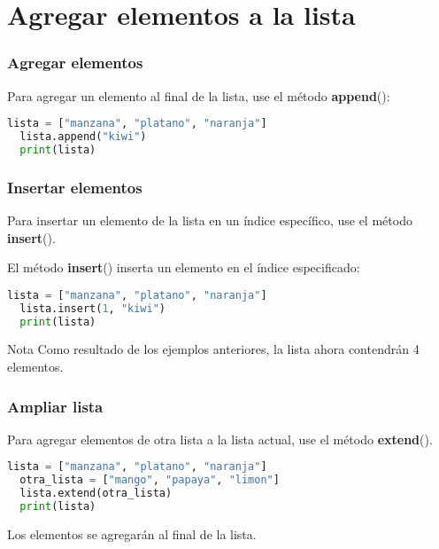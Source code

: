\section{Agregar elementos a la lista}

\begin{frame}[fragile]
  \frametitle{Agregar elementos}

  Para agregar un elemento al final de la lista, use el método
  \textbf{append}():

  \vspace{\baselineskip}
  \begin{lstlisting}[language=Python]
  lista = ["manzana", "platano", "naranja"]
  lista.append("kiwi")
  print(lista)
  \end{lstlisting}
\end{frame}

\begin{frame}[fragile]
  \frametitle{Insertar elementos}

  Para insertar un elemento de la lista en un índice específico,
  use el método \textbf{insert}().

  El método \textbf{insert}() inserta un elemento en el
  índice especificado: 

  \vspace{\baselineskip}
  \begin{lstlisting}[language=Python]
  lista = ["manzana", "platano", "naranja"]
  lista.insert(1, "kiwi")
  print(lista)
  \end{lstlisting}

  \begin{exampleblock}{Nota}
    Como resultado de los ejemplos anteriores,
    la lista ahora contendrán 4 elementos.
  \end{exampleblock}{}
\end{frame}

\begin{frame}[fragile]
  \frametitle{Ampliar lista}

  Para agregar elementos de otra lista a la lista actual,
  use el método \textbf{extend}(). 

  \vspace{\baselineskip}
  \begin{lstlisting}[language=Python]
  lista = ["manzana", "platano", "naranja"]
  otra_lista = ["mango", "papaya", "limon"]
  lista.extend(otra_lista)
  print(lista)
  \end{lstlisting}

  \vspace{\baselineskip}
  Los elementos se agregarán al final de la lista.
\end{frame}

